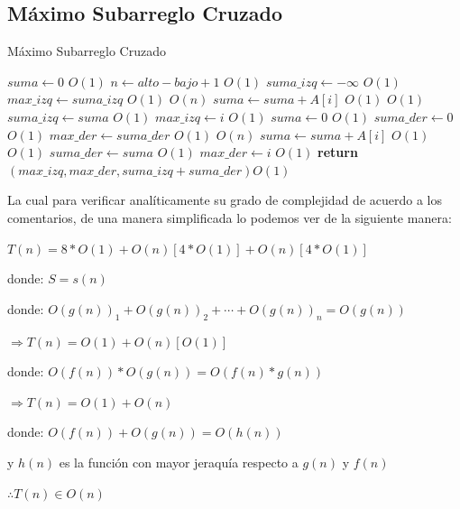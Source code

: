 \documentclass[12pt,twoside]{article}
\begin{document}
\subsection{\textbf{Máximo Subarreglo Cruzado}}
\begin{algorithm}
  \caption{Máximo Subarreglo Cruzado}\label{euclid}
  \begin{algorithmic}[1]
      \State $suma \gets 0$                                             \Comment $O(1)$
      \State $n \gets alto - bajo + 1$                                  \Comment $O(1)$
      \State $suma\_izq \gets -\infty$                                  \Comment $O(1)$
      \State $max\_izq \gets suma\_izq$                                 \Comment $O(1)$
                                   \Comment $O(n)$
        \State $suma \gets suma + A[i]$                                 \Comment $O(1)$
                                                 \Comment $O(1)$
          \State $suma\_izq \gets suma$                                 \Comment $O(1)$
          \State $max\_izq \gets i$                                     \Comment $O(1)$
        \EndIf                                                          
      \EndFor
      \State $suma \gets 0$                                             \Comment $O(1)$
      \State $suma\_der \gets 0$                                        \Comment $O(1)$
      \State $max\_der \gets suma\_der$                                 \Comment $O(1)$
                                \Comment $O(n)$
        \State $suma \gets suma + A[i]$                                 \Comment $O(1)$
                                                 \Comment $O(1)$
          \State $suma\_der \gets suma$                                 \Comment $O(1)$
          \State $max\_der \gets i$                                     \Comment $O(1)$
        \EndIf                                                          
      \EndFor
      \State \textbf{return} $(max\_izq, max\_der, suma\_izq + suma\_der)$\Comment $O(1)$
  \EndFunction
  \end{algorithmic}
\end{algorithm}

La cual para verificar analíticamente su grado de complejidad de acuerdo a los comentarios, de una manera simplificada lo podemos ver de la siguiente
manera: 

\centerline{$T(n) = 8*O(1)+O(n)[4*O(1)]+O(n)[4*O(1)]$}
\centerline{}
\centerline{donde: $S = s(n)$}
\centerline{}
\centerline{donde: $O(g(n))_{1} + O(g(n))_{2}+\cdots+O(g(n))_n = O(g(n))$}
\centerline{}
\centerline{$\Rightarrow T(n) = O(1)+O(n)[O(1)]$}
\centerline{}
\centerline{donde: $O(f(n)) * O(g(n))= O(f(n)*g(n))$}
\centerline{}
\centerline{$\Rightarrow T(n) = O(1) + O(n)$}
\centerline{}
\centerline{donde: $O(f(n)) + O(g(n)) = O(h(n))$}
\centerline{y $h(n)$ es la funci\'on con mayor jeraqu\'ia respecto a $g(n)$ y $f(n)$}
\centerline{}
\centerline{$\therefore T(n) \in O(n) $}
\end{document}
